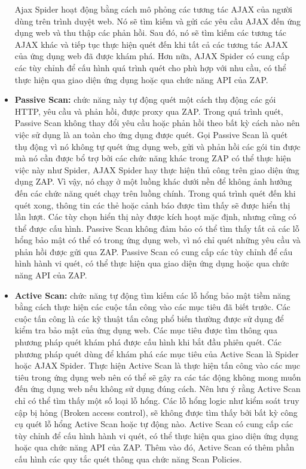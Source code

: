 \begin{itemize}
        \par
        Ajax Spider hoạt động bằng cách mô phỏng các tương tác AJAX của người dùng trên trình duyệt web. Nó sẽ tìm kiếm và gửi các yêu cầu AJAX đến ứng dụng web và thu thập các phản hồi. Sau đó, nó sẽ tìm kiếm các tương tác AJAX khác và tiếp tục thực hiện quét đến khi tất cả các tương tác AJAX của ứng dụng web đã được khám phá. Hơn nữa, AJAX Spider có cung cấp các tùy chỉnh để cấu hình quá trình quét cho phù hợp với nhu cầu, có thể thực hiện qua giao diện ứng dụng hoặc qua chức năng API của ZAP.
  \item \textbf{Passive Scan:} chức năng này tự động quét một cách thụ động các gói HTTP, yêu cầu và phản hồi, được proxy qua ZAP. Trong quá trình quét, Passive Scan không thay đổi yêu cầu hoặc phản hồi theo bất kỳ cách nào nên việc sử dụng là an toàn cho ứng dụng được quét. Gọi Passive Scan là quét thụ động vì nó không tự quét ứng dụng web, gửi và phản hồi các gói tin được mà nó cần được bổ trợ bởi các chức năng khác trong ZAP có thể thực hiện việc này như Spider, AJAX Spider hay thực hiện thủ công trên giao diện ứng dụng ZAP. Vì vậy, nó chạy ở một luồng khác dưới nền để không ảnh hưởng đến các chức năng quét chạy trên luồng chính.
        Trong quá trình quét đến khi quét xong, thông tin các thẻ hoặc cảnh báo được tìm thấy sẽ được hiển thị lần lượt. Các tùy chọn hiển thị này được kích hoạt mặc định, nhưng cũng có thể được cấu hình. Passive Scan không đảm bảo có thể tìm thấy tất cả các lỗ hổng bảo mật có thể có trong ứng dụng web, vì nó chỉ quét những yêu cầu và phản hồi được gửi qua ZAP. Passive Scan có cung cấp các tùy chỉnh để cấu hình hành vi quét, có thể thực hiện qua giao diện ứng dụng hoặc qua chức năng API của ZAP.
  \item \textbf{Active Scan:} chức năng tự động tìm kiếm các lỗ hổng bảo mật tiềm năng bằng cách thực hiện các cuộc tấn công vào các mục tiêu đã biết trước. Các cuộc tấn công là các kỹ thuật tấn công phổ biến thường được sử dụng để kiểm tra bảo mật của ứng dụng web. Các mục tiêu được tìm thông qua phương pháp quét khám phá được cấu hình khi bắt đầu phiên quét. Các phương pháp quét dùng để khám phá các mục tiêu của Active Scan là Spider hoặc AJAX Spider.
        Thực hiện Active Scan là thực hiện tấn công vào các mục tiêu trong ứng dụng web nên có thể sẽ gây ra các tác động không mong muốn đến ứng dụng web nếu không sử dụng đúng cách. Nên lưu ý rằng Active Scan chỉ có thể tìm thấy một số loại lỗ hổng. Các lỗ hổng logic như kiểm soát truy cập bị hỏng (Broken access control), sẽ không được tìm thấy bởi bất kỳ công cụ quét lỗ hổng Active Scan hoặc tự động nào. Active Scan có cung cấp các tùy chỉnh để cấu hình hành vi quét, có thể thực hiện qua giao diện ứng dụng hoặc qua chức năng API của ZAP. Thêm vào đó, Active Scan có thêm phần cấu hình các quy tắc quét thông qua chức năng Scan Policies.

\end{itemize}
